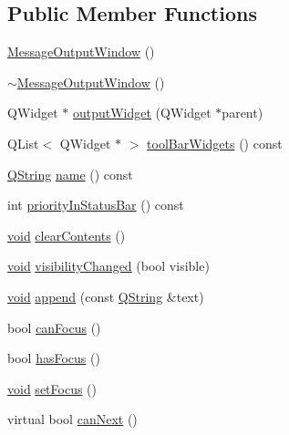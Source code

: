 \subsection*{\-Public \-Member \-Functions}
\begin{DoxyCompactItemize}
\item 
\hyperlink{group___core_plugin_ga5e3eee057a8fc9f116f9cec5bb51ba0d}{\-Message\-Output\-Window} ()
\item 
\hyperlink{group___core_plugin_gafbe2484cac096ccb3fe637fdba3a163e}{$\sim$\-Message\-Output\-Window} ()
\item 
\-Q\-Widget $\ast$ \hyperlink{group___core_plugin_ga978c79305cbaabe74f6569035fb4369e}{output\-Widget} (\-Q\-Widget $\ast$parent)
\item 
\-Q\-List$<$ \-Q\-Widget $\ast$ $>$ \hyperlink{group___core_plugin_gacc1af51900b4902f2dd63640107ff14e}{tool\-Bar\-Widgets} () const 
\item 
\hyperlink{group___u_a_v_objects_plugin_gab9d252f49c333c94a72f97ce3105a32d}{\-Q\-String} \hyperlink{group___core_plugin_ga77ee2886510c6915930d1825f3186b54}{name} () const 
\item 
int \hyperlink{group___core_plugin_ga23ebc377d471fd9d98481a19d0554d50}{priority\-In\-Status\-Bar} () const 
\item 
\hyperlink{group___u_a_v_objects_plugin_ga444cf2ff3f0ecbe028adce838d373f5c}{void} \hyperlink{group___core_plugin_ga7e8265ade5df23729e5c595d422d7422}{clear\-Contents} ()
\item 
\hyperlink{group___u_a_v_objects_plugin_ga444cf2ff3f0ecbe028adce838d373f5c}{void} \hyperlink{group___core_plugin_ga009be0f4be24f547f0670a5ac63b458c}{visibility\-Changed} (bool visible)
\item 
\hyperlink{group___u_a_v_objects_plugin_ga444cf2ff3f0ecbe028adce838d373f5c}{void} \hyperlink{group___core_plugin_gaf547a10d779b7f71fd4d16295b55ac6a}{append} (const \hyperlink{group___u_a_v_objects_plugin_gab9d252f49c333c94a72f97ce3105a32d}{\-Q\-String} \&text)
\item 
bool \hyperlink{group___core_plugin_gac6b3dcfb20703e83a37a97925fa6934d}{can\-Focus} ()
\item 
bool \hyperlink{group___core_plugin_ga8c332418cc91754e54d188abd1126357}{has\-Focus} ()
\item 
\hyperlink{group___u_a_v_objects_plugin_ga444cf2ff3f0ecbe028adce838d373f5c}{void} \hyperlink{group___core_plugin_gaba73b1a517e47415a365697fcae21645}{set\-Focus} ()
\item 
virtual bool \hyperlink{group___core_plugin_gacc3882fb4a97e10b34a8ea1397b03d6b}{can\-Next} ()

\end{DoxyCompactItemize}
